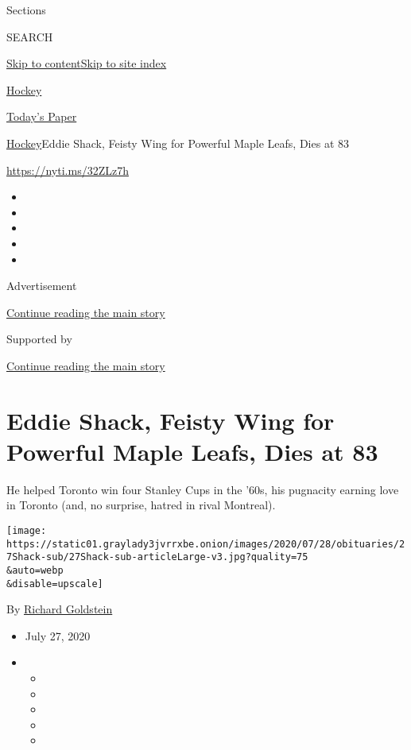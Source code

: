 Sections

SEARCH

\protect\hyperlink{site-content}{Skip to
content}\protect\hyperlink{site-index}{Skip to site index}

\href{https://www.nytimes3xbfgragh.onion/section/sports/hockey}{Hockey}

\href{https://myaccount.nytimes3xbfgragh.onion/auth/login?response_type=cookie\&client_id=vi}{}

\href{https://www.nytimes3xbfgragh.onion/section/todayspaper}{Today's
Paper}

\href{/section/sports/hockey}{Hockey}\textbar{}Eddie Shack, Feisty Wing
for Powerful Maple Leafs, Dies at 83

\url{https://nyti.ms/32ZLz7h}

\begin{itemize}
\item
\item
\item
\item
\item
\end{itemize}

Advertisement

\protect\hyperlink{after-top}{Continue reading the main story}

Supported by

\protect\hyperlink{after-sponsor}{Continue reading the main story}

\hypertarget{eddie-shack-feisty-wing-for-powerful-maple-leafs-dies-at-83}{%
\section{Eddie Shack, Feisty Wing for Powerful Maple Leafs, Dies at
83}\label{eddie-shack-feisty-wing-for-powerful-maple-leafs-dies-at-83}}

He helped Toronto win four Stanley Cups in the '60s, his pugnacity
earning love in Toronto (and, no surprise, hatred in rival Montreal).

\texttt{[image: https://static01.graylady3jvrrxbe.onion/images/2020/07/28/obituaries/27Shack-sub/27Shack-sub-articleLarge-v3.jpg?quality=75\\\&auto=webp\\\&disable=upscale]}

By
\href{https://www.nytimes3xbfgragh.onion/by/richard-goldstein}{Richard
Goldstein}

\begin{itemize}
\item
  July 27, 2020
\item
  \begin{itemize}
  \item
  \item
  \item
  \item
  \item
  \end{itemize}
\end{itemize}

